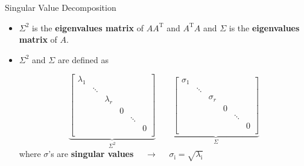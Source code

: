\begin{frame}[t]{Singular Value Decomposition}
	\begin{itemize}
        \item $\Sigma^2$ is the \textbf{eigenvalues matrix} of $A A^{\text{T}}$ and
            $A^{\text{T}} A$ and  $\Sigma$ is the \textbf{eigenvalues matrix} of
            $A$.

        \item $\Sigma^2$ and $\Sigma$ are defined as  
        
        \begin{equation*}
            \underbrace{
			\begin{bmatrix}
				\lambda_1 & & & & & \\
				& \ddots & & & &  \\
				& & \lambda_r & & & \\
				& & & 0 & & \\
				& & & & \ddots & \\
				& & & & & 0\\
            \end{bmatrix}}_{\Sigma^2}
            \quad \quad
            \underbrace{
            \begin{bmatrix}
				\sigma_1 & & & & & \\
				& \ddots & & & &  \\
				& & \sigma_r & & & \\
				& & & 0 & & \\
				& & & & \ddots & \\
				& & & & & 0\\
            \end{bmatrix}}_{\Sigma}
        \end{equation*}
            where $\sigma$'s are \textbf{singular values} $\quad \rightarrow \quad$  $\sigma_{\text{i}}=\sqrt{\lambda_{\text{i}}}$
    \end{itemize}
\end{frame}

